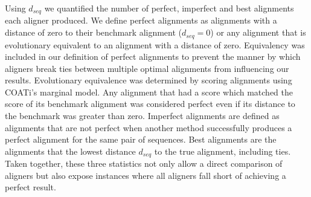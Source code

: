 \documentclass[12pt,letterpaper]{article}
\newcommand{\cyan}[1]{\textcolor{cyan}{#1}}
\begin{document}


Using $d_{seq}$ we quantified the number of perfect, imperfect and best alignments each aligner produced. We define perfect alignments as alignments with a distance of zero to their benchmark alignment ($d_{seq} = 0$) or any alignment that is evolutionary equivalent to an alignment with a distance of zero. Equivalency was included in our definition of perfect alignments to prevent the manner by which aligners break ties between multiple optimal alignments from influencing our results. Evolutionary equivalence was determined by scoring alignments using COATi's marginal model. Any alignment that had a score which matched the score of its benchmark alignment was considered perfect even if its distance to the benchmark was greater than zero.
%
Imperfect alignments are defined as alignments that are not perfect when another method successfully produces a perfect alignment for the same pair of sequences.
%
Best alignments are the alignments that the lowest distance $d_{seq}$ to the true alignment, including ties.
%
Taken together, these three statistics not only allow a direct comparison of aligners but also expose instances where all aligners fall short of achieving a perfect result.


\end{document}
